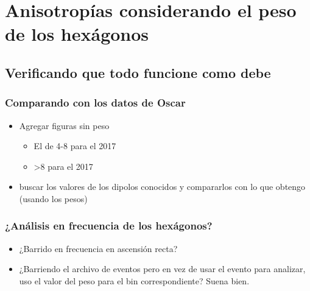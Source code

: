 
\section{Anisotropías  considerando el peso de los hexágonos}

\subsection{Verificando que todo funcione como debe}





\subsubsection{Comparando con los datos de Oscar}

\begin{itemize}
	\item Agregar figuras sin peso 
	\begin{itemize}
		\item El de 4-8 para el 2017
		\item >8 para el 2017
	\end{itemize}
	\item buscar los valores de los dipolos conocidos y compararlos con lo que obtengo (usando los pesos)
\end{itemize}

\subsubsection{¿Análisis en frecuencia de los hexágonos?} \label{analisis_peso}
\begin{itemize}
	\item ¿Barrido en frecuencia en ascensión recta?
	\item ¿Barriendo el archivo de eventos pero en vez de usar el evento para analizar, uso el valor del peso para el bin correspondiente? Suena bien.
\end{itemize}


